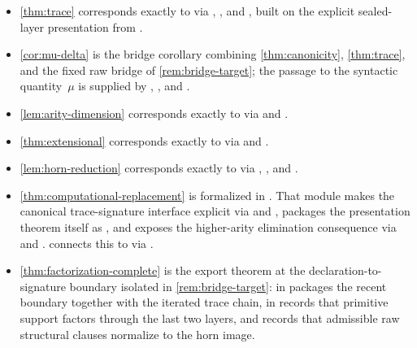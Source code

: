 \documentclass{lmcs}
\begin{document}
{\begin{itemize}[nosep]
\item \autoref{thm:trace} corresponds exactly to  via , , and , built on the explicit sealed-layer presentation  from .
\item \autoref{cor:mu-delta} is the bridge corollary combining \autoref{thm:canonicity}, \autoref{thm:trace}, and the fixed raw bridge of \autoref{rem:bridge-target}; the passage to the syntactic quantity~$\mu$ is supplied by , , and .
\item \autoref{lem:arity-dimension} corresponds exactly to  via  and .
\item \autoref{thm:extensional} corresponds exactly to  via  and .
\item \autoref{lem:horn-reduction} corresponds exactly to  via , , and .
\item \autoref{thm:computational-replacement} is formalized in . That module makes the canonical trace-signature interface explicit via  and , packages the presentation theorem itself as , and exposes the higher-arity elimination consequence via  and .  connects this to  via .
\item \autoref{thm:factorization-complete} is the export theorem at the declaration-to-signature boundary isolated in \autoref{rem:bridge-target}:  in  packages the recent boundary together with the iterated trace chain,  in  records that primitive support factors through the last two layers, and  records that admissible raw structural clauses normalize to the horn image.

\end{itemize}}
\end{document}
